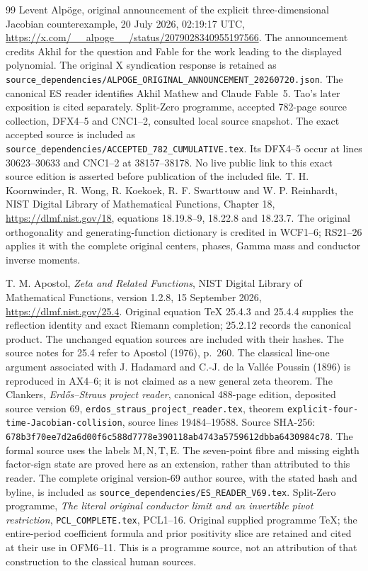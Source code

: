 \documentclass[11pt]{article}
\begin{document}
\begin{thebibliography}{99}
 Levent Alp\"oge,
original announcement of the explicit three-dimensional Jacobian
counterexample, 20 July 2026, 02:19:17 UTC,
\url{https://x.com/__alpoge__/status/2079028340955197566}.
The announcement credits Akhil for the question and Fable for the
work leading to the displayed polynomial. The original X syndication
response is retained as
\nolinkurl{source_dependencies/ALPOGE_ORIGINAL_ANNOUNCEMENT_20260720.json}.
The canonical ES reader identifies Akhil Mathew and Claude Fable~5.
Tao's later exposition is cited separately.
 Split-Zero programme, accepted 782-page source
collection, DFX4--5 and CNC1--2, consulted local source snapshot.
 The exact accepted source is included as
\nolinkurl{source_dependencies/ACCEPTED_782_CUMULATIVE.tex}.
Its DFX4--5 occur at lines 30623--30633 and CNC1--2 at
38157--38178. No live public link to this exact source edition
is asserted before publication of the included file.
 T. H. Koornwinder, R. Wong, R. Koekoek,
R. F. Swarttouw and W. P. Reinhardt,
NIST Digital Library of Mathematical Functions, Chapter 18,
\url{https://dlmf.nist.gov/18}, equations 18.19.8--9,
18.22.8 and 18.23.7. The original orthogonality and generating-function
dictionary is credited in WCF1--6; RS21--26 applies it with the complete
original centers, phases, Gamma mass and conductor inverse moments.


 T. M. Apostol, \emph{Zeta and Related Functions},
NIST Digital Library of Mathematical Functions, version 1.2.8,
15 September 2026, \url{https://dlmf.nist.gov/25.4}.
Original equation TeX 25.4.3 and 25.4.4 supplies the reflection
identity and exact Riemann completion; 25.2.12 records the canonical
product. The unchanged equation sources are included with their hashes.
The source notes for 25.4 refer to Apostol (1976), p.~260.
The classical line-one argument associated with J. Hadamard and
C.-J. de la Vall\'ee Poussin (1896) is reproduced in AX4--6;
it is not claimed as a new general zeta theorem.
 The Clankers, \emph{Erd\H{o}s--Straus project reader},
canonical 488-page edition, deposited source version 69,
\texttt{erdos\_straus\_project\_reader.tex}, theorem
\texttt{explicit-four-time-Jacobian-collision}, source lines
19484--19588. Source SHA-256:
\texttt{678b3f70ee7d2a6d00f6c588d7778e390118ab4743a5759612dbba6430984c78}.
The formal source uses the labels $\mathrm M,\mathrm N,\mathrm T,\mathrm E$.
The seven-point fibre and missing eighth factor-sign state are proved
here as an extension, rather than attributed to this reader.
 The complete original version-69 author source,
with the stated hash and byline, is included as
\nolinkurl{source_dependencies/ES_READER_V69.tex}.
 Split-Zero programme,
\emph{The literal original conductor limit and an invertible pivot restriction},
\texttt{PCL\_COMPLETE.tex}, PCL1--16. Original supplied programme TeX;
the entire-period coefficient formula and prior positivity slice are
retained and cited at their use in OFM6--11. This is a programme source,
not an attribution of that construction to the classical human sources.




\end{thebibliography}
\end{document}

